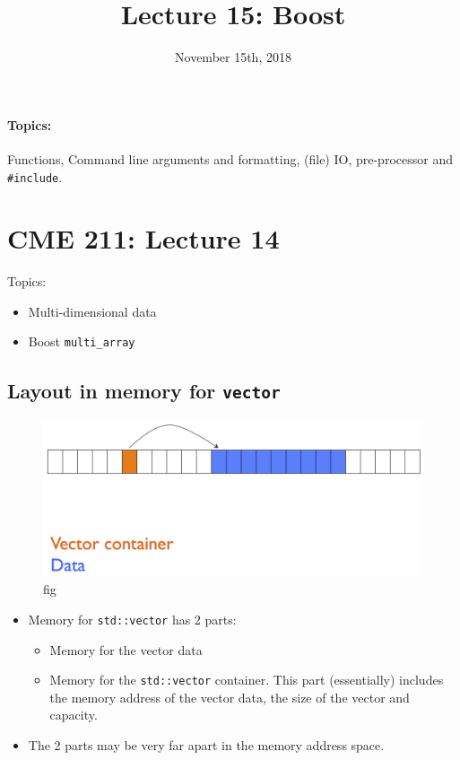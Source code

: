 \documentclass[12pt,letterpaper,twoside]{article}
\begin{document}
\title{Lecture 15: Boost\vspace{-5ex}}
\date{November 15th, 2018}
\maketitle

{\footnotesize
\paragraph{Topics:} Functions, Command line arguments and
formatting, (file) IO, pre-processor and \texttt{\#include}.
}
\vspace{-3ex}

\hypertarget{cme-211-lecture-14}{%
\section{CME 211: Lecture 14}\label{cme-211-lecture-14}}

Topics:

\begin{itemize}
\tightlist
\item
  Multi-dimensional data
\item
  Boost \texttt{multi\_array}
\end{itemize}

\hypertarget{layout-in-memory-for-vector}{%
\subsection{\texorpdfstring{Layout in memory for
\texttt{vector}}{Layout in memory for vector}}\label{layout-in-memory-for-vector}}

\begin{figure}
\centering
\includegraphics{fig/vector-memory.png}
\caption{fig}
\end{figure}

\begin{itemize}
\item
  Memory for \texttt{std::vector} has 2 parts:

  \begin{itemize}
  \item
    Memory for the vector data
  \item
    Memory for the \texttt{std::vector} container. This part
    (essentially) includes the memory address of the vector data, the
    size of the vector and capacity.
  \end{itemize}
\item
  The 2 parts may be very far apart in the memory address space.
\end{itemize}
\end{document}
